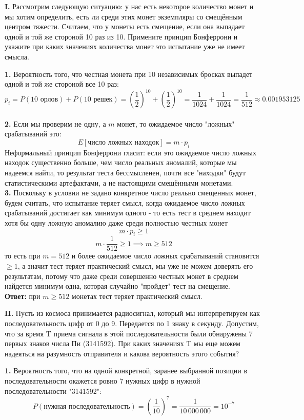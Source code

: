 \documentclass{article}
\begin{document}
\begin{framed}
    \textbf{I.} Рассмотрим следующую ситуацию: у нас есть некоторое количество монет и мы
    хотим определить, есть ли среди этих монет экземпляры со смещённым центром
    тяжести. Считаем, что у монеты есть смещение, если она выпадает одной и той
    же стороной 10 раз из 10. Примените принцип Бонферрони и укажите при каких
    значениях количества монет это испытание уже не имеет смысла.
\end{framed}
    \textbf{1.} Вероятность того, что честная монета при 10 независимых бросках выпадет одной и той же стороной все 10 раз:\[p_i=P(\text{10 орлов}) + P(\text{10 решек})=\left(\frac{1}{2}\right)^{10}+\left(\frac{1}{2}\right)^{10}=\frac{1}{1024}+\frac{1}{1024}=\frac{1}{512}\approx0.001953125\]\\

    \textbf{2.} Если мы проверим не одну, а $m$ монет, то ожидаемое число "ложных" срабатываний это:\[E[\text{число ложных находок}]=m\cdot p_i\]
    Неформальный принцип Бонферрони гласит: если это ожидаемое число ложных находок существенно больше, чем число реальных аномалий, которые мы надеемся найти, то результат теста бессмысленен, почти все "находки" будут статистическими артефактами, а не настоящими смещёнными монетами.\\

    \textbf{3.} Поскольку в условии не задано конкретное число реально смещенных монет, будем считать, что испытание теряет смысл, когда ожидаемое число ложных срабатываний достигает как минимум одного - то есть тест в среднем находит хотя бы одну ложную аномалию даже среди полностью честных монет\[m\cdot p_i \ge 1\] \[m\cdot \frac{1}{512} \ge 1 \implies m \ge 512\]
    то есть при $m=512$ и более ожидаемое число ложных срабатываний становится $\ge1$, а значит тест теряет практический смысл, мы уже не можем доверять его результатам, потому что даже среди совершенно честных монет в среднем найдется минимум одна, которая случайно "пройдет" тест на смещение.\\
    
    \textbf{Ответ:} при $m \ge 512$ монетах тест теряет практический смысл.

\begin{framed}
    \textbf{II.} Пусть из космоса принимается радиосигнал, который мы интерпретируем как
    последовательность цифр от 0 до 9. Передается по 1 знаку в секунду. Допустим,
    что за время T приема сигнала в этой последовательности были обнаружены 7
    первых знаков числа Пи (3141592). При каких значениях T мы еще можем
    надеяться на разумность отправителя и какова вероятность этого события?
\end{framed}
    \textbf{1.} Вероятность того, что на одной конкретной, заранее выбранной позиции в последовательности окажется ровно 7 нужных цифр в нужной последовательности "3141592": \[P(\text{нужная последовательность})=\left(\frac{1}{10}\right)^{7}=\frac{1}{10\,000\,000}=10^{-7}\]\\
\end{document}
